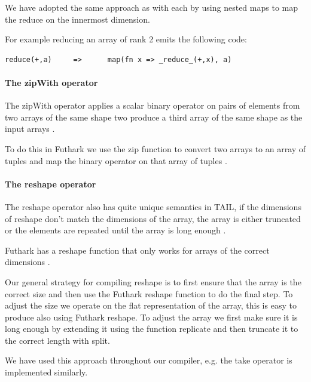 \documentclass[11pt]{article}
\begin{document}
We have adopted the same approach as with each by using nested maps to map the reduce on the innermost dimension.
 
For example reducing an array of rank 2 emits the following code:
 
\begin{lstlisting}[numbers=none,frame=none]
reduce(+,a)     =>      map(fn x => _reduce_(+,x), a)
\end{lstlisting}


\paragraph{The zipWith operator}
The zipWith operator applies a scalar binary operator on pairs of elements from two arrays of the same shape two
produce a third array of the same shape as the input arrays \cite{ElsmanDybdal:Array:2014}.
 
To do this in Futhark we use the zip function to convert two arrays to an array of tuples and map the binary operator on that array of tuples \cite{TroelsHenriksen}.


\paragraph{The reshape operator} 
The reshape operator also has quite unique semantics in TAIL, if the dimensions of reshape don't match the dimensions of the array, the
array is either truncated or the elements are repeated until the array is long enough \cite{ElsmanDybdal:Array:2014}.

Futhark has a reshape function that only works for arrays of the correct dimensions \cite{TroelsHenriksen}.

Our general strategy for compiling reshape is to first ensure that the array is the correct size and then use the Futhark reshape
function to do the final step. To adjust the size we operate on the flat representation of the array, this is easy to produce also
using Futhark reshape. To adjust the array we first make sure it is long enough by extending it using the function replicate and then
truncate it to the correct length with split.



We have used this approach throughout our compiler, e.g. the take operator is implemented similarly.
\end{document}
